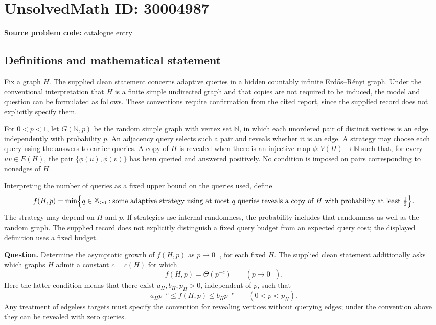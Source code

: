 \documentclass[11pt]{article}
\newcommand{\N}{\mathbb{N}}
\newcommand{\Z}{\mathbb{Z}}
\begin{document}
\section*{UnsolvedMath ID: 30004987}
\textbf{Source problem code:} catalogue entry
\subsection{Definitions and mathematical statement}
Fix a graph \(H\). The supplied clean statement concerns adaptive queries in a hidden countably infinite Erd\H{o}s--R\'enyi graph. Under the conventional interpretation that \(H\) is a finite simple undirected graph and that copies are not required to be induced, the model and question can be formulated as follows. These conventions require confirmation from the cited report, since the supplied record does not explicitly specify them.

For \(0<p<1\), let \(G(\N,p)\) be the random simple graph with vertex set \(\N\), in which each unordered pair of distinct vertices is an edge independently with probability \(p\). An adjacency query selects such a pair and reveals whether it is an edge. A strategy may choose each query using the answers to earlier queries. A copy of \(H\) is revealed when there is an injective map \(\phi:V(H)\to\N\) such that, for every \(uv\in E(H)\), the pair \(\{\phi(u),\phi(v)\}\) has been queried and answered positively. No condition is imposed on pairs corresponding to nonedges of \(H\).

Interpreting the number of queries as a fixed upper bound on the queries used, define
\[
f(H,p)=\min\Bigl\{q\in\Z_{\geq0}:\text{some adaptive strategy using at most }q\text{ queries reveals a copy of }H\text{ with probability at least }\tfrac12\Bigr\}.
\]
The strategy may depend on \(H\) and \(p\). If strategies use internal randomness, the probability includes that randomness as well as the random graph. The supplied record does not explicitly distinguish a fixed query budget from an expected query cost; the displayed definition uses a fixed budget.

\textbf{Question.} Determine the asymptotic growth of \(f(H,p)\) as \(p\to0^+\), for each fixed \(H\). The supplied clean statement additionally asks which graphs \(H\) admit a constant \(c=c(H)\) for which
\[
f(H,p)=\Theta\!\left(p^{-c}\right)\qquad(p\to0^+).
\]
Here the latter condition means that there exist \(a_H,b_H,p_H>0\), independent of \(p\), such that
\[
a_Hp^{-c}\leq f(H,p)\leq b_Hp^{-c}\qquad(0<p<p_H).
\]
Any treatment of edgeless targets must specify the convention for revealing vertices without querying edges; under the convention above they can be revealed with zero queries.
\end{document}
